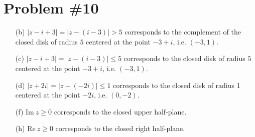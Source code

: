 \documentclass{article}
\newcounter{Problem}
\begin{document}
\section*{Problem \#10}
\begin{itemize}
  \item[(b)]
  {
    $|z - i + 3| = |z - (i - 3)| > 5$ corresponds to the complement of
    the closed disk of radius $5$ centered at the point $-3 + i$,
    i.e. $(-3, 1)$.
  }
  \item[(c)]
  {
    $|z - i + 3| = |z - (i - 3)| \leq 5$ corresponds to the closed
    disk of radius $5$ centered at the point $-3 + i$, i.e. $(-3, 1)$.
  }
  \item[(d)]
  {
    $|z + 2i| = |z - (-2i)| \leq 1$ corresponds to the closed disk of
    radius 1 centered at the point $-2i$, i.e. $(0, -2)$.
  }
  \item[(f)]
  {
    $\mathrm{Im}~z \geq 0$ corresponds to the closed upper half-plane.
  }
  \item[(h)]
  {
    $\mathrm{Re}~z \geq 0$ corresponds to the closed right half-plane.
  }
\end{itemize}
\end{document}
